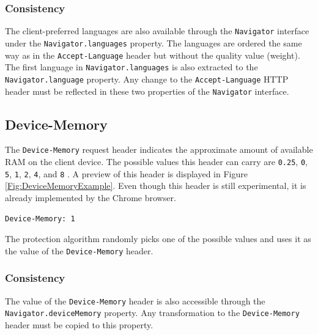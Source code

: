 \subsubsection{Consistency}

The client-preferred languages are also available through the \texttt{Navigator} interface under the \texttt{Navigator.languages} property. The languages are ordered the same way as in the \texttt{Accept-Language} header but without the quality value (weight). The first language in \texttt{Navigator.languages} is also extracted to the \texttt{Navigator.language} property. Any change to the \texttt{Accept-Language} HTTP header must be reflected in these two properties of the \texttt{Navigator} interface.

\subsection{Device-Memory}
\label{SubSection:DeviceMemory}

The \texttt{Device-Memory} request header indicates the approximate amount of available RAM on the client device. The possible values this header can carry are \verb|0.25|, \verb|0|, \verb|5|, \verb|1|, \verb|2|, \verb|4|, and \verb|8| \cite{MDN}. A preview of this header is displayed in Figure \ref{Fig:DeviceMemoryExample}. Even though this header is still experimental, it is already implemented by the Chrome browser.

\bigbreak

\begin{lstlisting}[caption={An example of Device-Memory header contents \cite{MDN}.}, label={Fig:DeviceMemoryExample}]
Device-Memory: 1
\end{lstlisting}

\medbreak


The protection algorithm randomly picks one of the possible values and uses it as the value of the \texttt{Device-Memory} header.

\subsubsection{Consistency}

The value of the \texttt{Device-Memory} header is also accessible through the \texttt{Navigator.deviceMemory} property. Any transformation to the \texttt{Device-Memory} header must be copied to this property.

